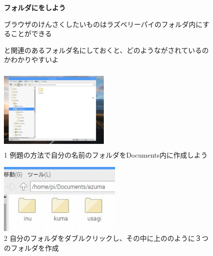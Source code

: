 \documentclass[a4paper,12pt]{jarticle}
\begin{document}
\begin{figure}[t]
  \flushleft
  {\bfseries
    フォルダにをしよう}

  ブラウザのけんさくしたいものはラズベリーパイのフォルダ内にすることができる

  と関連のあるフォルダ名にしておくと、どのようながされているのかわかりやすいよ



  \begin{minipage}{\textwidth}
    \begin{minipage}{6.582cm}
      \includegraphics[width=5.401cm,height=4.152cm]{textbook-img093.png}\\
      1 例題の方法で自分の名前のフォルダをDocuments内に作成しよう
    \end{minipage}
    \begin{minipage}{3.582cm}
    \end{minipage}
    \begin{minipage}{6.582cm}
      \includegraphics[width=5.995cm,height=3.475cm]{textbook-img094.jpg}\\
      2 自分のフォルダをダブルクリックし、その中に上ののように３つのフォルダを作成
    \end{minipage}
  \end{minipage}



\end{figure}
\end{document}
